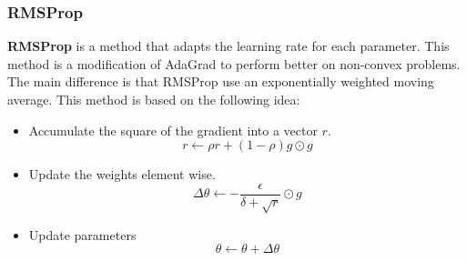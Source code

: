 \subsubsection{RMSProp}
\textbf{RMSProp} is a method that adapts the learning rate for each parameter.
This method is a modification of AdaGrad to perform better on non-convex problems.
The main difference is that RMSProp use an exponentially weighted moving average.
This method is based on the following idea:
\begin{itemize}
    \item Accumulate the square of the gradient into a vector $r$.
          \begin{equation}
              r \gets \rho r + (1 - \rho) g \odot g
          \end{equation}
    \item Update the weights element wise.
          \begin{equation}
              \Delta \theta \gets - \frac{\epsilon}{\delta + \sqrt{r}} \odot g
          \end{equation}
    \item Update parameters
          \begin{equation}
              \theta \gets \theta + \Delta \theta
          \end{equation}
\end{itemize}
